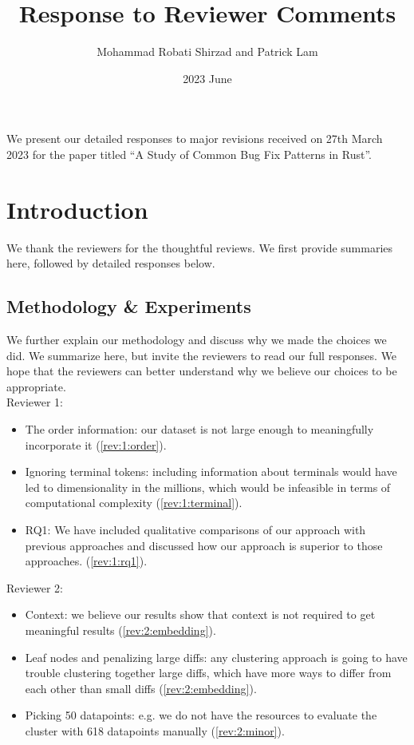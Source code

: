 \documentclass{article}
\title{Response to Reviewer Comments}
\date{2023 June}
\author{Mohammad Robati Shirzad and Patrick Lam}
\begin{document}
\maketitle

We present our detailed responses to major revisions received on 27th March 2023 for the paper titled ``A Study of Common Bug Fix Patterns in Rust''.

\section{Introduction}

We thank the reviewers for the thoughtful reviews. We first provide summaries here, followed by detailed responses below.

\subsection{Methodology \& Experiments}

We further explain our methodology and discuss why we made the choices we did. We summarize here, but invite the reviewers to read our full responses. We hope that the reviewers can better understand why we believe our choices to be appropriate. \\ 

Reviewer 1:
\begin{itemize}
    \item The order information: our dataset is not large enough to meaningfully incorporate it (\ref{rev:1:order}).
    \item Ignoring terminal tokens: including information about terminals would have led to dimensionality in the millions, which would be infeasible in terms of computational complexity (\ref{rev:1:terminal}). 
    \item RQ1: We have included qualitative comparisons of our approach with previous approaches and discussed how our approach is superior to those approaches. (\ref{rev:1:rq1}).
\end{itemize} 

Reviewer 2:
\begin{itemize}
    \item Context: we believe our results show that context is not required to get meaningful results (\ref{rev:2:embedding}).
    \item Leaf nodes and penalizing large diffs: any clustering approach is going to have trouble clustering together large diffs, which have more ways to differ from each other than small diffs (\ref{rev:2:embedding}). 
    \item Picking 50 datapoints: e.g. we do not have the resources to evaluate the cluster with 618 datapoints manually (\ref{rev:2:minor}).
\end{itemize}
\end{document}
